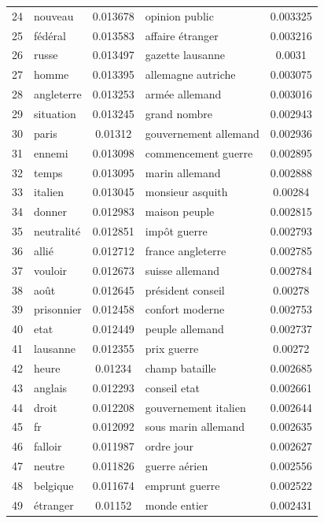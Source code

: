\documentclass[11pt]{article}
\begin{document}
\begin{table}[H]
\begin{tabular*}{\textwidth}{|l|| @{\extracolsep{\fill}} l c || l c |}
24 & nouveau & 0.013678 & opinion public & 0.003325 \\
25 & fédéral & 0.013583 & affaire étranger & 0.003216 \\
26 & russe & 0.013497 & gazette lausanne & 0.0031 \\
27 & homme & 0.013395 & allemagne autriche & 0.003075 \\
28 & angleterre & 0.013253 & armée allemand & 0.003016 \\
29 & situation & 0.013245 & grand nombre & 0.002943 \\
30 & paris & 0.01312 & gouvernement allemand & 0.002936 \\
31 & ennemi & 0.013098 & commencement guerre & 0.002895 \\
32 & temps & 0.013095 & marin allemand & 0.002888 \\
33 & italien & 0.013045 & monsieur asquith & 0.00284 \\
34 & donner & 0.012983 & maison peuple & 0.002815 \\
35 & neutralité & 0.012851 & impôt guerre & 0.002793 \\
36 & allié & 0.012712 & france angleterre & 0.002785 \\
37 & vouloir & 0.012673 & suisse allemand & 0.002784 \\
38 & août & 0.012645 & président conseil & 0.00278 \\
39 & prisonnier & 0.012458 & confort moderne & 0.002753 \\
40 & etat & 0.012449 & peuple allemand & 0.002737 \\
41 & lausanne & 0.012355 & prix guerre & 0.00272 \\
42 & heure & 0.01234 & champ bataille & 0.002685 \\
43 & anglais & 0.012293 & conseil etat & 0.002661 \\
44 & droit & 0.012208 & gouvernement italien & 0.002644 \\
45 & fr & 0.012092 & sous marin allemand & 0.002635 \\
46 & falloir & 0.011987 & ordre jour & 0.002627 \\
47 & neutre & 0.011826 & guerre aérien & 0.002556 \\
48 & belgique & 0.011674 & emprunt guerre & 0.002522 \\
49 & étranger & 0.01152 & monde entier & 0.002431 \\
\hline
\end{tabular*}
\end{table}
\end{document}
